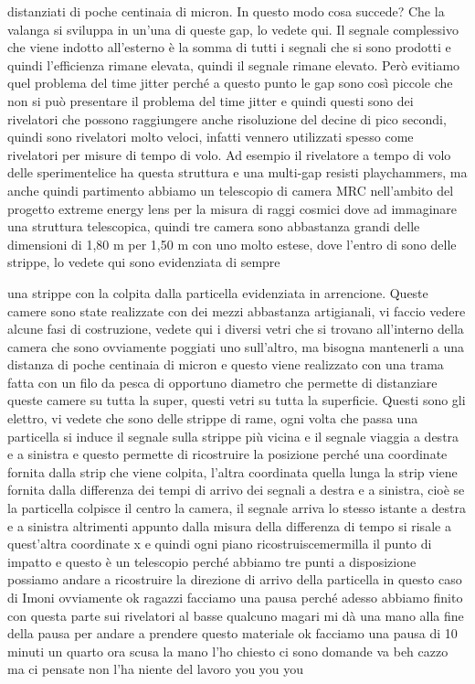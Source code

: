 {distanziati di poche centinaia di micron. In questo modo cosa succede? Che la valanga si sviluppa in un'una di queste gap, lo vedete qui. Il segnale complessivo che viene indotto all'esterno è la somma di tutti i segnali che si sono prodotti e quindi l'efficienza rimane elevata, quindi il segnale rimane elevato. Però evitiamo quel problema del time jitter perché a questo punto le gap sono così piccole che non si può presentare il problema del time jitter e quindi questi sono dei rivelatori che possono raggiungere anche risoluzione del decine di pico secondi, quindi sono rivelatori molto veloci, infatti vennero utilizzati spesso come rivelatori per misure di tempo di volo. Ad esempio il rivelatore a tempo di volo delle sperimentelice ha questa struttura e una multi-gap resisti playchammers, ma anche quindi partimento abbiamo un telescopio di camera MRC nell'ambito del progetto extreme energy lens per la misura di raggi cosmici dove ad immaginare una struttura telescopica, quindi tre camera sono abbastanza grandi delle dimensioni di 1,80 m per 1,50 m con uno molto estese, dove l'entro di sono delle strippe, lo vedete qui sono evidenziata di sempre 


una strippe con la colpita dalla particella evidenziata in arrencione. Queste camere sono state realizzate con dei mezzi abbastanza artigianali, vi faccio vedere alcune fasi di costruzione, vedete qui i diversi vetri che si trovano all'interno della camera che sono ovviamente poggiati uno sull'altro, ma bisogna mantenerli a una distanza di poche centinaia di micron e questo viene realizzato con una trama fatta con un filo da pesca di opportuno diametro che permette di distanziare queste camere su tutta la super, questi vetri su tutta la superficie. Questi sono gli elettro, vi vedete che sono delle strippe di rame, ogni volta che passa una particella si induce il segnale sulla strippe più vicina e il segnale viaggia a destra e a sinistra e questo permette di ricostruire la posizione perché una coordinate fornita dalla strip che viene colpita, l'altra coordinata quella lunga la strip viene fornita dalla differenza dei tempi di arrivo dei segnali a destra e a sinistra, cioè se la particella colpisce il centro la camera, il segnale arriva lo stesso istante a destra e a sinistra altrimenti appunto dalla misura della differenza di tempo si risale a quest'altra coordinate x e quindi ogni piano ricostruiscemermilla il punto di impatto e questo è un telescopio perché abbiamo tre punti a disposizione possiamo andare a ricostruire la direzione di arrivo della particella in questo caso di Imoni ovviamente ok ragazzi facciamo una pausa perché adesso abbiamo finito con questa parte sui rivelatori al basse qualcuno magari mi dà una mano alla fine della pausa per andare a prendere questo materiale ok facciamo una pausa di 10 minuti un quarto ora scusa la mano l'ho chiesto ci sono domande va beh cazzo ma ci pensate non l'ha niente del lavoro you you you


}

